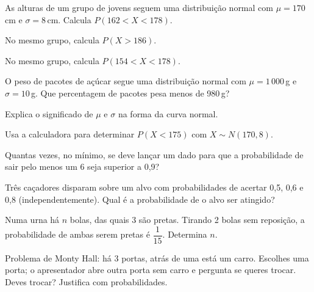 \documentclass[12pt]{article}
\begin{document}
\begin{exercicios}
  \item As alturas de um grupo de jovens seguem uma distribuição normal com $\mu = 170$\,cm e $\sigma = 8$\,cm. Calcula $P(162 < X < 178)$.
  \item No mesmo grupo, calcula $P(X > 186)$.
  \item No mesmo grupo, calcula $P(154 < X < 178)$.
  \item O peso de pacotes de açúcar segue uma distribuição normal com $\mu = 1\,000$\,g e $\sigma = 10$\,g. Que percentagem de pacotes pesa menos de 980\,g?
  \item Explica o significado de $\mu$ e $\sigma$ na forma da curva normal.
  \item Usa a calculadora para determinar $P(X < 175)$ com $X \sim N(170, 8)$.
\end{exercicios}

\begin{exercicios}
  \item Quantas vezes, no mínimo, se deve lançar um dado para que a probabilidade de sair pelo menos um 6 seja superior a 0,9?
  \item Três caçadores disparam sobre um alvo com probabilidades de acertar 0,5, 0,6 e 0,8 (independentemente). Qual é a probabilidade de o alvo ser atingido?
  \item Numa urna há $n$ bolas, das quais 3 são pretas. Tirando 2 bolas sem reposição, a probabilidade de ambas serem pretas é $\dfrac{1}{15}$. Determina $n$.
  \item Problema de Monty Hall: há 3 portas, atrás de uma está um carro. Escolhes uma porta; o apresentador abre outra porta sem carro e pergunta se queres trocar. Deves trocar? Justifica com probabilidades.
\end{exercicios}
\end{document}
